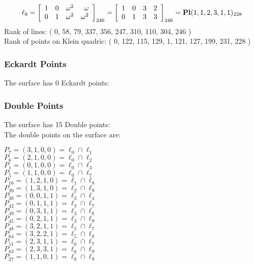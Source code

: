 \documentclass{article}
\begin{document}
{$$
\ell_{9} = 
\left[
\begin{array}{*{4}{r}}
1 & 0 & \omega^{2} & \omega \\
0 & 1 & \omega^{2} & \omega^{2}\\
\end{array}
\right]
_{246}
=
\left[
\begin{array}{*{4}c}
1  & 0  & 3  & 2\\
0  & 1  & 3  & 3\\
\end{array}
\right]_{246}
={\rm\bf Pl}(1,1,2,3,1,1 )_{228}$$
Rank of lines: ( 0, 58, 79, 337, 356, 247, 310, 110, 304, 246 )\\
Rank of points on Klein quadric: ( 0, 122, 115, 129, 1, 121, 127, 199, 231, 228 )\\
\subsubsection*{Eckardt Points}
The surface has 0 Eckardt points:\\
\subsubsection*{Double Points}
The surface has 15 Double points:\\
The double points on the surface are:\\
\begin{multicols}{2}
\noindent
$P_{7} = ( 3, 1, 0, 0 ) = \ell_{0} \cap \ell_{1} $\\
$P_{6} = ( 2, 1, 0, 0 ) = \ell_{0} \cap \ell_{2} $\\
$P_{1} = ( 0, 1, 0, 0 ) = \ell_{0} \cap \ell_{3} $\\
$P_{5} = ( 1, 1, 0, 0 ) = \ell_{0} \cap \ell_{7} $\\
$P_{16} = ( 1, 2, 1, 0 ) = \ell_{1} \cap \ell_{8} $\\
$P_{20} = ( 1, 3, 1, 0 ) = \ell_{2} \cap \ell_{9} $\\
$P_{38} = ( 0, 0, 1, 1 ) = \ell_{3} \cap \ell_{4} $\\
$P_{42} = ( 0, 1, 1, 1 ) = \ell_{3} \cap \ell_{7} $\\
$P_{49} = ( 0, 3, 1, 1 ) = \ell_{3} \cap \ell_{8} $\\
$P_{45} = ( 0, 2, 1, 1 ) = \ell_{3} \cap \ell_{9} $\\
$P_{48} = ( 3, 2, 1, 1 ) = \ell_{5} \cap \ell_{7} $\\
$P_{64} = ( 3, 2, 2, 1 ) = \ell_{5} \cap \ell_{8} $\\
$P_{51} = ( 2, 3, 1, 1 ) = \ell_{6} \cap \ell_{7} $\\
$P_{83} = ( 2, 3, 3, 1 ) = \ell_{6} \cap \ell_{9} $\\
$P_{27} = ( 1, 1, 0, 1 ) = \ell_{8} \cap \ell_{9} $\\
\end{multicols}
}
\end{document}
